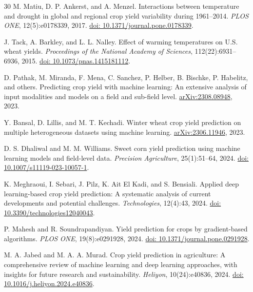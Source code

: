 \documentclass[11pt,a4paper]{article}
\begin{document}
\begin{thebibliography}{30}
M. Matiu, D. P. Ankerst, and A. Menzel.
\newblock Interactions between temperature and drought in global and regional crop yield variability during 1961--2014.
\newblock \emph{PLOS ONE}, 12(5):e0178339, 2017.
\newblock \href{https://doi.org/10.1371/journal.pone.0178339}{doi: 10.1371/journal.pone.0178339}.

J. Tack, A. Barkley, and L. L. Nalley.
\newblock Effect of warming temperatures on U.S. wheat yields.
\newblock \emph{Proceedings of the National Academy of Sciences}, 112(22):6931--6936, 2015.
\newblock \href{https://doi.org/10.1073/pnas.1415181112}{doi: 10.1073/pnas.1415181112}.

D. Pathak, M. Miranda, F. Mena, C. Sanchez, P. Helber, B. Bischke, P. Habelitz, and others.
\newblock Predicting crop yield with machine learning: An extensive analysis of input modalities and models on a field and sub-field level.
\newblock \href{https://arxiv.org/abs/2308.08948}{arXiv:2308.08948}, 2023.

Y. Bansal, D. Lillis, and M. T. Kechadi.
\newblock Winter wheat crop yield prediction on multiple heterogeneous datasets using machine learning.
\newblock \href{https://arxiv.org/abs/2306.11946}{arXiv:2306.11946}, 2023.

D. S. Dhaliwal and M. M. Williams.
\newblock Sweet corn yield prediction using machine learning models and field-level data.
\newblock \emph{Precision Agriculture}, 25(1):51--64, 2024.
\newblock \href{https://doi.org/10.1007/s11119-023-10057-1}{doi: 10.1007/s11119-023-10057-1}.

K. Meghraoui, I. Sebari, J. Pilz, K. Ait El Kadi, and S. Bensiali.
\newblock Applied deep learning-based crop yield prediction: A systematic analysis of current developments and potential challenges.
\newblock \emph{Technologies}, 12(4):43, 2024.
\newblock \href{https://doi.org/10.3390/technologies12040043}{doi: 10.3390/technologies12040043}.

P. Mahesh and R. Soundrapandiyan.
\newblock Yield prediction for crops by gradient-based algorithms.
\newblock \emph{PLOS ONE}, 19(8):e0291928, 2024.
\newblock \href{https://doi.org/10.1371/journal.pone.0291928}{doi: 10.1371/journal.pone.0291928}.

M. A. Jabed and M. A. A. Murad.
\newblock Crop yield prediction in agriculture: A comprehensive review of machine learning and deep learning approaches, with insights for future research and sustainability.
\newblock \emph{Heliyon}, 10(24):e40836, 2024.
\newblock \href{https://doi.org/10.1016/j.heliyon.2024.e40836}{doi: 10.1016/j.heliyon.2024.e40836}.


\end{thebibliography}
\end{document}
